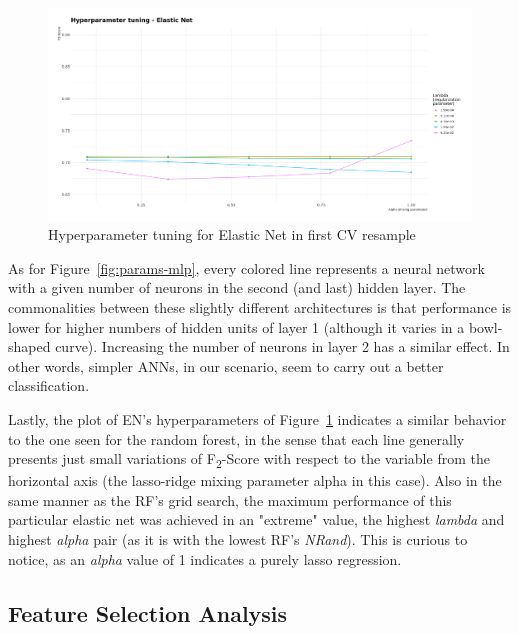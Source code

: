 \begin{figure}[H]
    \caption{Hyperparameter tuning for Elastic Net in first CV resample}
    \centerline{\includegraphics[scale=.21]{../reports/results/models_and_evals/summary/params_glmnet_resample_1.png}}
    \label{fig:params-glmnet}
\end{figure}

As for Figure~\ref{fig:params-mlp}, every colored line represents a neural network with a given number of neurons in the second (and last) hidden layer.
The commonalities between these slightly different architectures is that performance is lower for higher numbers of hidden units of layer 1 (although it varies in a bowl-shaped curve).
Increasing the number of neurons in layer 2 has a similar effect.
In other words, simpler ANNs, in our scenario, seem to carry out a better classification.

Lastly, the plot of EN's hyperparameters of Figure~\ref{fig:params-glmnet} indicates a similar behavior to the one seen for the random forest, in the sense that each line generally presents just small variations of F\textsubscript{2}-Score with respect to the variable from the horizontal axis (the lasso-ridge mixing parameter alpha in this case).
Also in the same manner as the RF's grid search, the maximum performance of this particular elastic net was achieved in an "extreme" value, the highest \textit{lambda} and highest \textit{alpha} pair (as it is with the lowest RF's \textit{NRand}).
This is curious to notice, as an \textit{alpha} value of 1 indicates a purely lasso regression.

\subsection{Feature Selection Analysis}\label{subsec:feature-selection-analysis}

